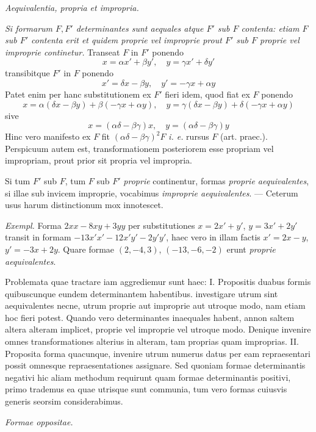 \begin{center}
\textit{Aequivalentia, propria et impropria.}
\end{center}

\textit{Si formarum $F,F'$ determinantes sunt aequales atque $F'$ sub $F$ contenta: etiam $F$ sub $F'$ contenta erit et quidem proprie vel improprie prout $F'$ sub $F$ proprie vel improprie continetur.} Transeat $F$ in $F'$ ponendo
\[
x=\alpha x'+\beta y',\quad y=\gamma x'+\delta y'
\]
transibitque $F'$ in $F$ ponendo
\[
x'=\delta x-\beta y,\quad y'=-\gamma x+\alpha y
\]
Patet enim per hanc substitutionem ex $F'$ fieri idem, quod fiat ex $F$ ponendo
\[
x=\alpha(\delta x-\beta y)+\beta(-\gamma x+\alpha y),\quad
y=\gamma(\delta x-\beta y)+\delta(-\gamma x+\alpha y)
\]
sive
\[
x=(\alpha\delta-\beta\gamma)x,\quad y=(\alpha\delta-\beta\gamma)y
\]
Hinc vero manifesto ex $F$ fit $(\alpha\delta-\beta\gamma)^2F$ \textit{i. e.} rursus $F$ (art. praec.). Perspicuum autem est, transformationem posteriorem esse propriam vel impropriam, prout prior sit propria vel impropria.

Si tum $F'$ sub $F$, tum $F$ sub $F'$ \textit{proprie} continentur, formas \textit{proprie aequivalentes}, si illae sub invicem improprie, vocabimus \textit{improprie aequivalentes}. --- Ceterum usus harum distinctionum mox innotescet.

\textit{Exempl.} Forma $2xx-8xy+3yy$ per substitutiones $x=2x'+y'$, $y=3x'+2y'$ transit in formam $-13x'x'-12x'y'-2y'y'$, haec vero in illam factis $x'=2x-y$, $y'=-3x+2y$. Quare formae $(2,-4,3)$, $(-13,-6,-2)$ erunt \textit{proprie aequivalentes}.

Problemata quae tractare iam aggrediemur sunt haec: I. Propositis duabus formis quibuscunque eundem determinantem habentibus. investigare utrum sint aequivalentes necne, utrum proprie aut improprie aut utroque modo, nam etiam hoc fieri potest. Quando vero determinantes inaequales habent, annon saltem altera alteram implicet, proprie vel improprie vel utroque modo. Denique invenire omnes transformationes alterius in alteram, tam proprias quam improprias. II. Proposita forma quacunque, invenire utrum numerus datus per eam repraesentari possit omnesque repraesentationes assignare. Sed quoniam formae determinantis negativi hic aliam methodum requirunt quam formae determinantis positivi, primo trademus ea quae utrisque sunt communia, tum vero formas cuiusvis generis seorsim considerabimus.

\begin{center}
\textit{Formae oppositae.}
\end{center}

